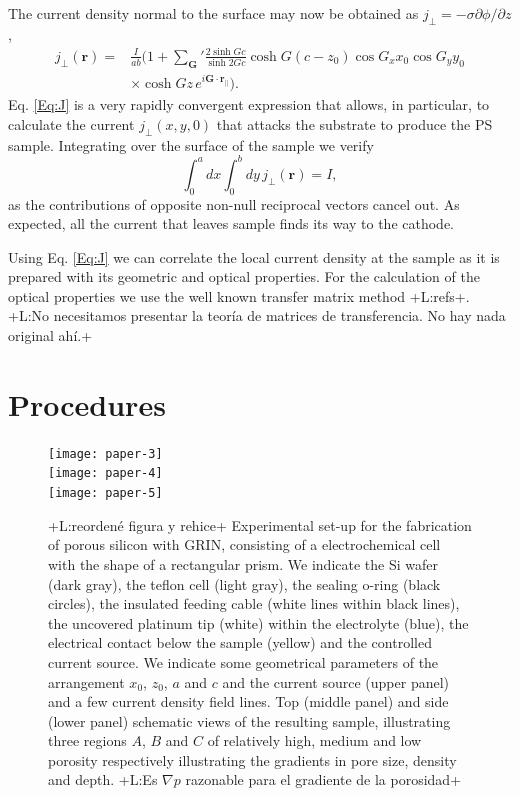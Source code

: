 \documentclass{article}
\newcommand{\notaL}[1]{{\color{blue}+L:#1+}}
\begin{document}
The current density normal to the surface may now be obtained as
$j_\perp=-\sigma\partial\phi/\partial z$,
\begin{equation}
  \label{Eq:J}
  \begin{split}
    j_\perp(\bm r) =& \frac{I}{ab}\biggl(1+{\sum_{\bm G}}'\frac{2\sinh
      Gc}{\sinh 2Gc}\cosh G(c-z_0)\cos G_x x_0 \cos G_y y_0\\
    &\times \cosh Gz\, e^{i\bm G\cdot\bm r_\|}\biggr).
  \end{split}
\end{equation}
Eq. \eqref{Eq:J} is a very rapidly convergent expression that allows,
in particular, to calculate the current $j_\perp(x,y,0)$ that attacks
the substrate to produce the PS sample.
Integrating over the surface of the sample we verify
\begin{equation}
  \label{eq:intj}
  \int_0^adx\int_0^bdy\,j_\perp(\bm r)=I,
\end{equation}
as the contributions of opposite non-null reciprocal vectors cancel
out. As expected, all the current that leaves sample finds
its way to the cathode.

Using Eq. \eqref{Eq:J} we can correlate the local current density at
the sample as it is prepared with its geometric and optical
properties. For the calculation of the optical properties we use the
well known transfer matrix method \notaL{refs}.
\notaL{No necesitamos presentar la teoría de matrices de
  transferencia. No hay nada original ahí.}


\section{Procedures}
\begin{figure}
  \centering
  \texttt{[image: paper-3]}\\[12pt]
  \texttt{[image: paper-4]}\\[12pt]
  \texttt{[image: paper-5]}

  \caption{\notaL{reordené figura y rehice} Experimental set-up for
    the fabrication of porous silicon with GRIN, consisting of a
    electrochemical cell with the shape of a
    rectangular prism. We indicate the Si wafer (dark
    gray), the teflon cell (light gray), the sealing o-ring (black
    circles), the insulated feeding cable (white lines within black
    lines), the uncovered platinum tip (white) within the
    electrolyte (blue), the electrical contact below the sample
    (yellow) and the controlled current source. We indicate some geometrical
    parameters of the arrangement $x_0$, $z_0$, $a$ and $c$
    and the current source (upper panel) and a few current density
    field lines. Top (middle panel) and
    side (lower panel) schematic views of the resulting sample,
    illustrating three regions $A$, $B$ and $C$ of relatively high, medium and
    low porosity respectively illustrating the gradients in pore
    size, density and depth. \notaL{Es $\nabla p$ razonable para el
      gradiente de la porosidad}}
  \label{fig:DE1}
\end{figure}
\end{document}
